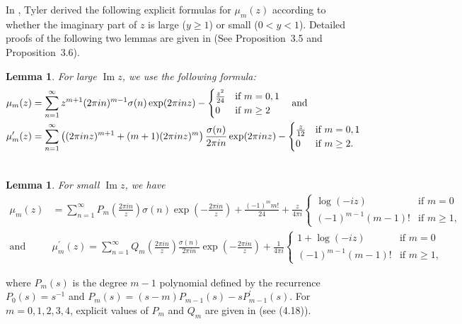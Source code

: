 \documentclass[10pt,a4paper]{amsart}
\newtheorem{lemma}[theorem]{Lemma}
\renewcommand{\Im}{\operatorname{Im}}
\numberwithin{equation}{section}
\begin{document}
	In \cite{tyler2026asymptotics}, Tyler derived the following explicit formulas for $\mu_m(z)$ according to whether the imaginary part of $z$ is large ($y\ge 1$) or small ($0<y<1$). Detailed proofs of the following two lemmas are given in \cite{barman2026asymptotic}(See Proposition~3.5 and Proposition~3.6).
	\begin{lemma}\label{eq-(2.1)}
		For large $\Im z$, we use the following formula:
		\begin{align*}
			\notag
			\mu_{m}(z)&=\sum_{n=1}^{\infty}z^{m+1}(2\pi in)^{m-1}\sigma(n)\exp(2\pi inz)- \begin{cases} 
				\frac{z^{2}}{24} & \mbox{if } m=0,1 \\ 
				0 & \mbox{if } m\ge 2 
			\end{cases} \quad\text{and}\\  
			\mu_{m}^{\prime}(z)&=\sum_{n=1}^{\infty}\left((2\pi inz)^{m+1}+(m+1)(2\pi inz)^{m}\right) \frac{\sigma(n)}{2\pi in}\exp(2\pi inz)-\begin{cases} 
				\frac{z}{12} & \mbox{if } m=0,1 \\ 
				0 & \mbox{if } m\ge 2. 
			\end{cases}\\ 
			\notag   
		\end{align*}
	\end{lemma}
	\begin{lemma}\label{eq-mue}
		For small $\Im z$, we have
		\begin{align*}
			\mu_{m}(z)&=\sum_{n=1}^{\infty}P_{m}\left(\frac{2\pi in}{z}\right)\sigma(n)\exp\left(-\frac{2\pi in}{z}\right)+\frac{(-1)^{m}m!}{24}+\frac{z}{4\pi i}\begin{cases} 
				\log(-iz) & \mbox{if } m=0 \\ 
				(-1)^{m-1}(m-1)! & \mbox{if } m\ge 1, 
			\end{cases} \\
			\text{and}\quad &\mu_{m}^{\prime}(z)=\sum_{n=1}^{\infty}Q_{m}\left(\frac{2\pi in}{z}\right)\frac{\sigma(n)}{2\pi in}\exp\left(-\frac{2\pi in}{z}\right)+\frac{1}{4\pi i}\begin{cases} 
				1+\log (-iz) & \mbox{if } m=0 \\ 
				(-1)^{m-1}(m-1)! & \mbox{if } m\ge 1, 
			\end{cases}  
		\end{align*}
	\end{lemma}
	where $P_{m}(s)$ is the degree $m-1$ polynomial defined by the recurrence $P_{0}(s)=s^{-1}$ and
	$P_{m}(s)=(s-m)P_{m-1}(s)-sP^{\prime}_{m-1}(s)$.  For $m=0,1,2,3,4$, explicit values of $P_m$ and $Q_m$ are given in \cite{tyler2026asymptotics} (see (4.18)). 
\end{document}
